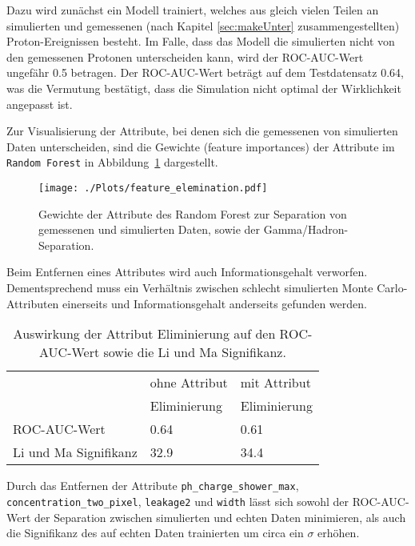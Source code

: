 Dazu wird zunächst ein Modell trainiert, welches aus gleich vielen Teilen an simulierten und gemessenen (nach Kapitel \ref{sec:makeUnter} zusammengestellten) Proton-Ereignissen besteht. 
Im Falle, dass das Modell die simulierten nicht von den gemessenen Protonen unterscheiden kann, wird der ROC-AUC-Wert ungefähr \num{0.5} betragen. 
Der ROC-AUC-Wert beträgt auf dem Testdatensatz \num{0.64}, was die Vermutung bestätigt, dass die Simulation nicht optimal der Wirklichkeit angepasst ist. 

Zur Visualisierung der Attribute, bei denen sich die gemessenen von simulierten Daten unterscheiden, sind die Gewichte (feature importances) der Attribute im \texttt{Random Forest} in Abbildung~\ref{fig:featureimportance} dargestellt. 
\begin{figure}[H]
  \centering
  \texttt{[image: ./Plots/feature\_elemination.pdf]}
  \caption{Gewichte der Attribute des Random Forest zur Separation von gemessenen und simulierten Daten, sowie der Gamma/Hadron-Separation.}
  \label{fig:featureimportance}
\end{figure}
Beim Entfernen eines Attributes wird auch Informationsgehalt verworfen. 
Dementsprechend muss ein Verhältnis zwischen schlecht simulierten Monte Carlo-Attributen einerseits und Informationsgehalt anderseits gefunden werden.
\begin{table}
  \centering
  \caption{Auswirkung der Attribut Eliminierung auf den ROC-AUC-Wert sowie die Li und Ma Signifikanz.}
  \begin{tabular}{l s s}
	\toprule
								& ohne Attribut & mit Attribut \\
								& Eliminierung 	& Eliminierung \\
	  	\cmidrule(r){2-3} 
	  	ROC-AUC-Wert 			& \num{0.64} & \num{0.61} \\
		Li und Ma Signifikanz 	& \SI{32.9}{\sigma} & \SI{34.4}{\sigma} \\
	\bottomrule
  \end{tabular}
  \label{tab:<+label+>}
\end{table}
Durch das Entfernen der Attribute \texttt{ph\_charge\_shower\_max}, \texttt{concentration\_two\_pixel}, \texttt{leakage2} und \texttt{width} lässt sich sowohl der ROC-AUC-Wert der Separation zwischen simulierten und echten Daten minimieren, als auch die Signifikanz des auf echten Daten trainierten  um circa ein $\sigma$ erhöhen.
